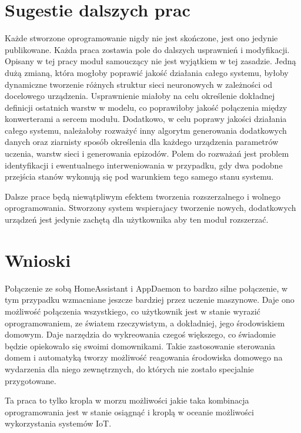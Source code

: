 \section*{Sugestie dalszych prac}
Każde stworzone oprogramowanie nigdy nie jest skończone, jest ono jedynie publikowane. Każda praca zostawia pole do dalszych usprawnień i modyfikacji. Opisany w tej pracy moduł samouczący nie jest wyjątkiem w tej zasadzie. Jedną dużą zmianą, która mogłoby poprawić jakość działania całego systemu, byłoby dynamiczne tworzenie różnych struktur sieci neuronowych w zależności od docelowego urządzenia. Usprawnienie miałoby na celu określenie dokładnej definicji ostatnich warstw w modelu, co poprawiłoby jakość połączenia między konwerterami a sercem modułu. Dodatkowo, w celu poprawy jakości działania całego systemu, należałoby rozważyć inny algorytm generowania dodatkowych danych oraz ziarnisty sposób określenia dla każdego urządzenia parametrów uczenia, warstw sieci i generowania epizodów. Polem do rozważań jest problem identyfikacji i ewentualnego interweniowania w przypadku, gdy dwa podobne przejścia stanów wykonują się pod warunkiem tego samego stanu systemu. 

Dalsze prace będą niewątpliwym efektem tworzenia rozszerzalnego i wolnego oprogramowania. Stworzony system wspierajacy tworzenie nowych, dodatkowych urządzeń jest jedynie zachętą dla użytkownika aby ten moduł rozszerzać.

\section*{Wnioski}

Połączenie ze sobą HomeAssistant i AppDaemon to bardzo silne połączenie, w tym przypadku wzmacniane jeszcze bardziej przez uczenie maszynowe. Daje ono możliwość połączenia wszystkiego, co użytkownik jest w stanie wyrazić oprogramowaniem, ze światem rzeczywistym, a dokładniej, jego środowiskiem domowym. Daje narzędzia do wykreowania czegoś większego, co świadomie będzie opiekowało się swoimi domownikami. Takie zastosowanie sterowania domem i automatyką tworzy możliwość reagowania środowiska domowego na wydarzenia dla niego zewnętrznych, do których nie zostało specjalnie przygotowane. 

Ta praca to tylko kropla w morzu możliwości jakie taka kombinacja oprogramowania jest w stanie osiągnąć i kroplą w oceanie możliwości wykorzystania systemów IoT.
